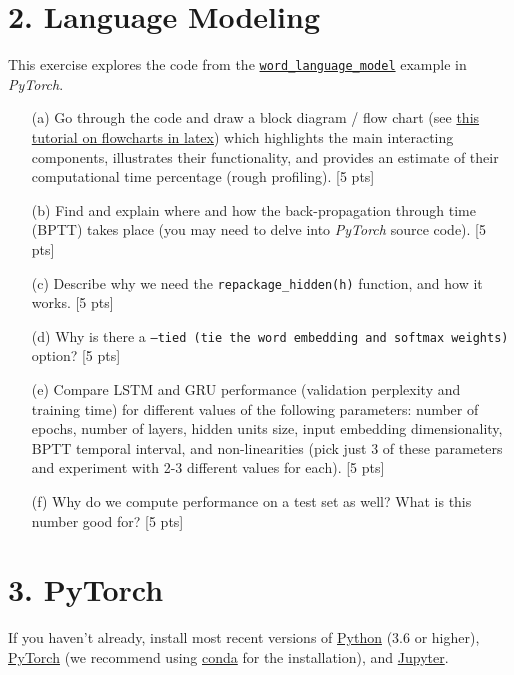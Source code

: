 \documentclass[12pt,letterpaper]{article}
\begin{document}
\newpage 

\section*{2. Language Modeling}

This exercise explores the code from the \href{https://github.com/pytorch/examples/tree/master/word_language_model}{\texttt{word\_language\_model}} example in \emph{PyTorch}.
\begin{enumerate}
\item[(a)] Go through the code and draw a block diagram / flow chart (see \href{https://www.sharelatex.com/blog/2013/08/29/tikz-series-pt3.html}{this tutorial on flowcharts in latex}) which highlights the main interacting components, illustrates their functionality, and provides an estimate of their computational time percentage (rough profiling). [5 pts]

\item[(b)] Find and explain where and how the back-propagation through time (BPTT) takes place (you may need to delve into \emph{PyTorch} source code). [5 pts]
\newline

\item[(c)] Describe why we need the \texttt{repackage\_hidden(h)} function, and how it works. [5 pts]
\newline

\item[(d)] Why is there a \texttt{--tied (tie the word embedding and softmax weights)} option? [5 pts]
\newline\

\item[(e)] Compare LSTM and GRU performance (validation perplexity and training time) for different values of the following parameters: number of epochs, number of layers, hidden units size, input embedding dimensionality, BPTT temporal interval, and non-linearities (pick just 3 of these parameters and experiment with 2-3 different values for each). [5 pts]

\item[(f)] Why do we compute performance on a test set as well? What is this number good for? [5 pts]

\end{enumerate}

\newpage
\section*{3. PyTorch}
If you haven't already, install most recent versions of 
\href{https://www.python.org/downloads/}{Python} (3.6 or higher), \href{https://pytorch.org/}{PyTorch} (we recommend using \href{https://conda.io/projects/conda/en/latest/user-guide/install/index.html}{conda} for the installation), and \href{https://jupyter.org/install.html}{Jupyter}.\\
\end{document}
